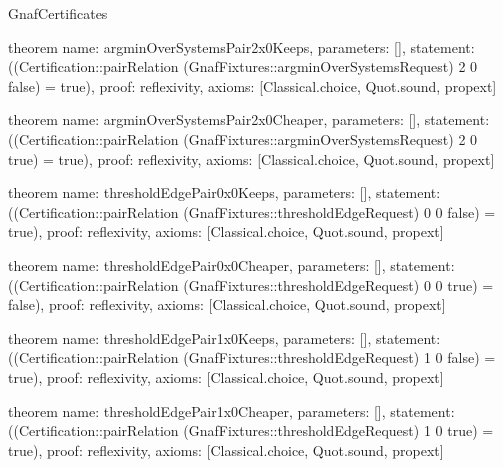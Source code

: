 \begin{lexlean}{GnafCertificates}
\begin{semanticmodule}
theorem{
  name: argminOverSystemsPair2x0Keeps,
  parameters: [],
  statement: ((Certification::pairRelation (GnafFixtures::argminOverSystemsRequest) 2 0 false) = true),
  proof: reflexivity{},
  axioms: [Classical.choice, Quot.sound, propext]
}

theorem{
  name: argminOverSystemsPair2x0Cheaper,
  parameters: [],
  statement: ((Certification::pairRelation (GnafFixtures::argminOverSystemsRequest) 2 0 true) = true),
  proof: reflexivity{},
  axioms: [Classical.choice, Quot.sound, propext]
}

theorem{
  name: thresholdEdgePair0x0Keeps,
  parameters: [],
  statement: ((Certification::pairRelation (GnafFixtures::thresholdEdgeRequest) 0 0 false) = true),
  proof: reflexivity{},
  axioms: [Classical.choice, Quot.sound, propext]
}

theorem{
  name: thresholdEdgePair0x0Cheaper,
  parameters: [],
  statement: ((Certification::pairRelation (GnafFixtures::thresholdEdgeRequest) 0 0 true) = false),
  proof: reflexivity{},
  axioms: [Classical.choice, Quot.sound, propext]
}

theorem{
  name: thresholdEdgePair1x0Keeps,
  parameters: [],
  statement: ((Certification::pairRelation (GnafFixtures::thresholdEdgeRequest) 1 0 false) = true),
  proof: reflexivity{},
  axioms: [Classical.choice, Quot.sound, propext]
}

theorem{
  name: thresholdEdgePair1x0Cheaper,
  parameters: [],
  statement: ((Certification::pairRelation (GnafFixtures::thresholdEdgeRequest) 1 0 true) = true),
  proof: reflexivity{},
  axioms: [Classical.choice, Quot.sound, propext]
}
\end{semanticmodule}
\end{lexlean}

